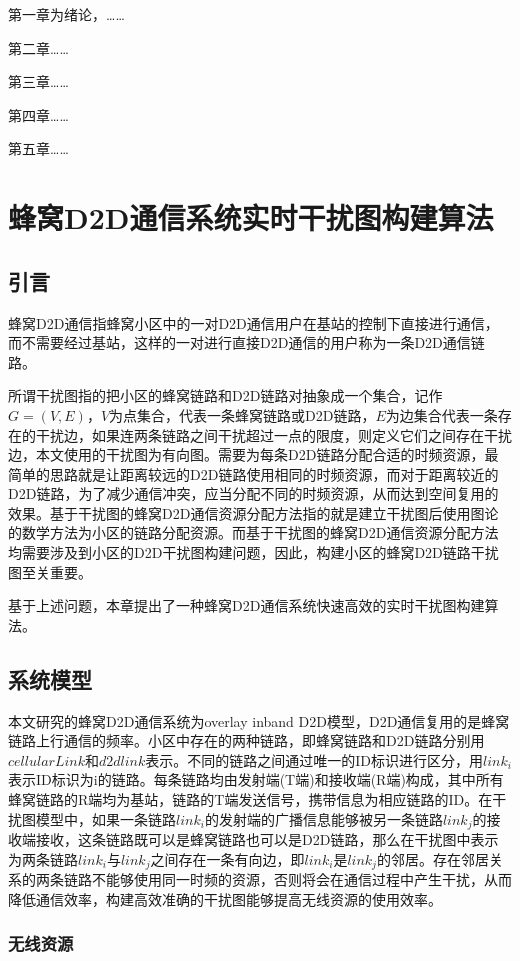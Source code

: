 \documentclass[figurelist,tablelist,algorithmlist,nomlist,masters]{seuthesix}
\begin{document}
	第一章为绪论，……
	
	第二章……
	
	第三章……
	
	第四章……
	
	第五章……
	
	\chapter{蜂窝D2D通信系统实时干扰图构建算法}
	\section{引言}
	蜂窝D2D通信指蜂窝小区中的一对D2D通信用户在基站的控制下直接进行通信，而不需要经过基站，这样的一对进行直接D2D通信的用户称为一条D2D通信链路。
	
	所谓干扰图指的把小区的蜂窝链路和D2D链路对抽象成一个集合，记作$G = (V,E)$，$V$为点集合，代表一条蜂窝链路或D2D链路，$E$为边集合代表一条存在的干扰边，如果连两条链路之间干扰超过一点的限度，则定义它们之间存在干扰边，本文使用的干扰图为有向图。需要为每条D2D链路分配合适的时频资源，最简单的思路就是让距离较远的D2D链路使用相同的时频资源，而对于距离较近的D2D链路，为了减少通信冲突，应当分配不同的时频资源，从而达到空间复用的效果。基于干扰图的蜂窝D2D通信资源分配方法指的就是建立干扰图后使用图论的数学方法为小区的链路分配资源。而基于干扰图的蜂窝D2D通信资源分配方法均需要涉及到小区的D2D干扰图构建问题，因此，构建小区的蜂窝D2D链路干扰图至关重要。
	
	基于上述问题，本章提出了一种蜂窝D2D通信系统快速高效的实时干扰图构建算法。
	
	\section{系统模型}
	本文研究的蜂窝D2D通信系统为overlay inband D2D模型，D2D通信复用的是蜂窝链路上行通信的频率。小区中存在的两种链路，即蜂窝链路和D2D链路分别用$cellularLink$和$d2dlink$表示。不同的链路之间通过唯一的ID标识进行区分，用$lin{k_i}$表示ID标识为i的链路。每条链路均由发射端(T端)和接收端(R端)构成，其中所有蜂窝链路的R端均为基站，链路的T端发送信号，携带信息为相应链路的ID。在干扰图模型中，如果一条链路$lin{k_i}$的发射端的广播信息能够被另一条链路$lin{k_j}$的接收端接收，这条链路既可以是蜂窝链路也可以是D2D链路，那么在干扰图中表示为两条链路$lin{k_i}$与$lin{k_j}$之间存在一条有向边，即$lin{k_i}$是$lin{k_j}$的邻居。存在邻居关系的两条链路不能够使用同一时频的资源，否则将会在通信过程中产生干扰，从而降低通信效率，构建高效准确的干扰图能够提高无线资源的使用效率。
	\subsection{无线资源}
\end{document}
